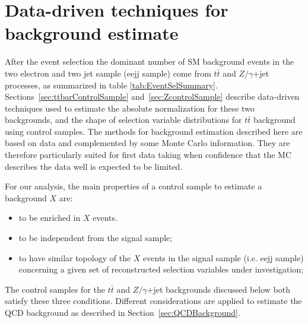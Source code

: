 % 

\section{Data-driven techniques for background estimate} \label{sec:bkgStudy}
After the event selection the dominant number of SM background events in the two electron 
and two jet sample (eejj sample) come from $t\bar{t}$ and $Z/\gamma$+jet processes, 
as summarized in table \ref{tab:EventSelSummary}. 
Sections~\ref{sec:ttbarControlSample} and~\ref{sec:ZcontrolSample} 
describe data-driven techniques used to estimate the absolute 
normalization for these two backgrounds, and the shape of selection variable 
distributions for $t\bar{t}$ background using control samples. 
The methods for background estimation described here are based on data and complemented by some Monte Carlo information. 
They are therefore particularly suited for first data taking when confidence that the MC describes
the data well is expected to be limited.

For our analysis, the main properties of a control sample to estimate a background $X$ are:
\begin{itemize}
%
\item to be enriched in $X$ events.
%
\item to be independent from the signal sample;
%
\item to have similar topology of the $X$ events in the signal sample (i.e. eejj sample) 
concerning a given set of reconstructed selection variables under investigation;  
%
\end{itemize}
%
The control samples for the $t\bar{t}$ and $Z/\gamma$+jet backgrounds discussed below both satisfy 
these three conditions.
Different considerations are applied to estimate the QCD background as described in 
Section~\ref{sec:QCDBackground}.



